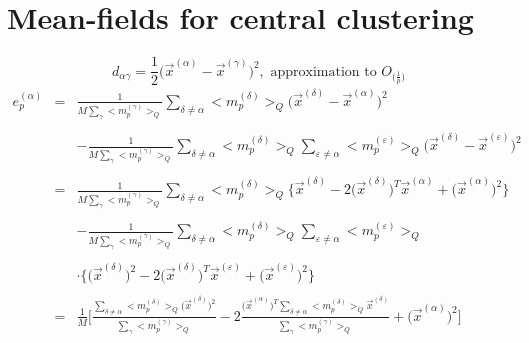 \documentclass[a4paper,11pt]{article}
\begin{document}
\section{Mean-fields for central clustering}
\begin{equation}
	d_{\alpha\gamma} = \frac{1}{2} \big( \vec{x}^{(\alpha)} 
		- \vec{x}^{(\gamma)} \big)^2, \text{ approximation to }
		O_{\big( \frac{1}{p} \big)}
\end{equation}
\begin{equation}
	\begin{array}{lll}
	e_p^{(\alpha)}
	& = & \frac{1}{M \sum\limits_\gamma \big< m_p^{(\gamma)} \big>_Q}
		\sum\limits_{\delta \neq \alpha} \big< m_p^{(\delta)}
		\big>_Q \big( \vec{x}^{(\delta)} - \vec{x}^{(\alpha)} \big)^2
		\\\\
	&& -\frac{1}{M \sum\limits_\gamma \big< m_p^{(\gamma)} \big>_Q}
		\sum\limits_{\delta \neq \alpha} \big< m_p^{(\delta)} \big>_Q
		\sum\limits_{\varepsilon \neq \alpha} \big<m_p^{(\varepsilon)}
		\big>_Q \big( \vec{x}^{(\delta)} 
		- \vec{x}^{(\varepsilon)} \big)^2 \\\\
	& = & \frac{1}{M \sum\limits_\gamma \big< m_p^{(\gamma)} \big>_Q}
		\sum\limits_{\delta \neq \alpha} \big< m_p^{(\delta)}
		\big>_Q \bigg\{ \vec{x}^{(\delta)} - 2\big(\vec{x}^{(\delta)}
			\big)^T \vec{x}^{(\alpha)} + \big(\vec{x}^{(\alpha)}
			\big)^2\bigg\} \\\\
	&& -\frac{1}{M \sum\limits_\gamma \big< m_p^{(\gamma)} \big>_Q}
		\sum\limits_{\delta \neq \alpha} \big< m_p^{(\delta)}
		\big>_Q \sum\limits_{\varepsilon \neq \alpha}
			\big< m_p^{(\varepsilon)} \big>_Q \\\\
	&& \cdot\bigg\{ \big( \vec{x}^{(\delta)} \big)^2 
			- 2\big(\vec{x}^{(\delta)}
			\big)^T \vec{x}^{(\varepsilon)} 
			+ \big(\vec{x}^{(\varepsilon)} \big)^2\bigg\} \\\\
	& = & \frac{1}{M} \Bigg[ \frac{\sum\limits_{\delta \neq \alpha} 
		\big< m_p^{(\delta)} \big>_Q \big(\vec{x}^{(\delta)} \big)^2 }{
			\sum\limits_\gamma \big< m_p^{(\gamma)} \big>_Q}
		-2 \frac{\big(\vec{x}^{(\alpha)} \big)^T 
			\sum\limits_{\delta \neq \alpha} 
			\big< m_p^{(\delta)} \big>_Q \vec{x}^{(\delta)}}{
				\sum\limits_\gamma \big< m_p^{(\gamma)}
				\big>_Q} + \big( \vec{x}^{(\alpha)} \big)^2
			\Bigg] \\\\

\end{array}
\end{equation}
\end{document}
